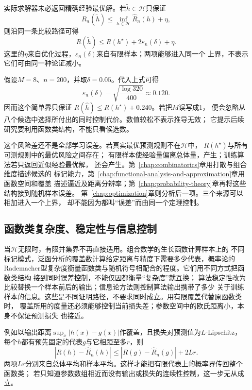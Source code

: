 实际求解器未必返回精确经验最优解。若$\widetilde h\in\mathcal H$只保证
\[
  \widehat{R}_n(\widetilde h)
  \leq
  \inf_{h\in\mathcal H}\widehat{R}_n(h)+\eta,
\]
则沿同一条比较路径可得
\[
  R(\widetilde h)
  \leq
  R(h^\star)+2\varepsilon_n(\delta)+\eta.
\]
这里的$\eta$来自优化过程，$\varepsilon_n(\delta)$来自有限样本；两项能够进入同一个
上界，不表示它们可由同一种论证减小。

\begin{example}[有限候选中的选择代价]
  \label{ex:future-finite-hypothesis-selection}
  假设$M=8$、$n=200$，并取$\delta=0.05$。代入上式可得
  \[
    \varepsilon_n(\delta)
    =
    \sqrt{\frac{\log 320}{400}}
    \approx 0.120.
  \]
  因而这个简单界只保证
  $R(\widehat h)\leq R(h^\star)+0.240$。若把$M$误写成$1$，
  便会忽略从八个候选中选择所付出的同时控制代价。数值较松不表示推导无效；
  它提示后续研究要利用函数类结构，不能只看候选数。
\end{example}

这个风险差还不是全部学习误差。若真实最优预测规则不在$\mathcal{H}$中，
$R(h^\star)$与所有可测规则中的最优风险之间存在；
有限样本使经验量偏离总体量，产生；训练算法若只返回近似经验最优解，
还会产生。第~\ref{chap:combinatorics}章用打散与组合维度描述候选的
标记能力，第~\ref{chap:functional-analysis-and-approximation}章用函数空间和覆盖
描述逼近及距离分辨率；第~\ref{chap:probability-theory}章再将这些结构接到随机样本误差。
第~\ref{chap:optimization}章则分析后一项。三个来源可以相加进入一个上界，
却不能因为都叫“误差”而由同一个定理控制。

\subsection{函数类复杂度、稳定性与信息控制}
\label{sec:future-function-classes-algorithms}

当$\mathcal{H}$无限时，有限并集界不再直接适用。组合数学的生长函数计算样本上的
不同标记模式，泛函分析的覆盖数计算给定距离与精度下需要多少代表，概率论的
Rademacher型复杂度衡量函数类与随机符号相配合的程度。它们用不同方式把函数类结构
接到同时误差控制，不能仅因都衡量“复杂度”就互换；
算法稳定性改为比较替换一个样本前后的输出；信息论方法则控制算法输出携带了多少
关于训练样本的信息。这些是不同证明路径，不要求同时成立。用有限覆盖代替原函数类时，
覆盖所用的度量还必须能够控制当前损失差；参数空间中的欧氏距离小，本身不保证预测损失
也接近。

例如以输出距离$\sup_x|h(x)-g(x)|$作覆盖，且损失对预测值为$L$-Lipschitz，
每个$h$都有预先固定的代表$g$与它相距至多$r$，则
\[
  |R(h)-\widehat R_n(h)|
  \leq |R(g)-\widehat R_n(g)|+2Lr.
\]
两项$Lr$分别来自总体平均和样本平均。这样才能把有限代表上的概率界传回整个函数类；
若只知道参数数组相近而没有输出或损失的连续性控制，这一步无从成立。

